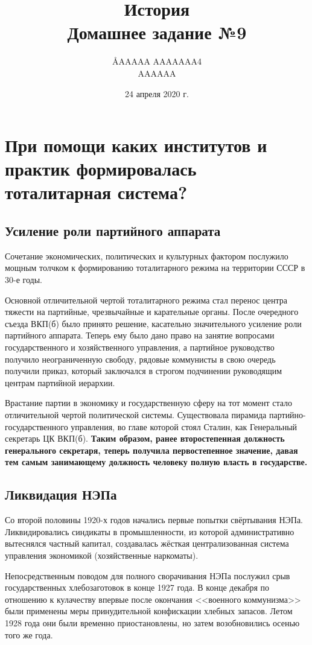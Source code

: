 \documentclass[12pt]{article}
\title{История \\ Домашнее задание №9}
\author{\AA{AAAAA AAAAAAA}{4} \\ AAAAAA}
\date{24 апреля 2020 г.}
\begin{document}
  \maketitle

  \setcounter{section}{2}
  \section{При помощи каких институтов и практик формировалась тоталитарная система?}
  \subsection{Усиление роли партийного аппарата}
  Сочетание экономических, политических и культурных фактором послужило мощным толчком к формированию тоталитарного режима на территории СССР в 30-е годы.

  Основной отличительной чертой тоталитарного режима стал перенос центра тяжести на партийные, чрезвычайные и карательные органы.
  После очередного съезда ВКП(б) было принято решение, касательно значительного усиление роли партийного аппарата.
  Теперь ему было дано право на занятие вопросами государственного и хозяйственного управления, а партийное руководство получило неограниченную свободу, рядовые коммунисты в свою очередь получили приказ, который заключался в строгом подчинении руководящим центрам партийной иерархии.

  Врастание партии в экономику и государственную сферу на тот момент стало отличительной чертой политической системы.
  Существовала пирамида партийно-государственного управления, во главе которой стоял Сталин, как Генеральный секретарь ЦК ВКП(б).
  \textbf{Таким образом, ранее второстепенная должность генерального секретаря, теперь получила первостепенное значение,
  давая тем самым занимающему должность человеку полную власть в государстве.}

  \subsection{Ликвидация НЭПа}
  Со второй половины 1920-х годов начались первые попытки свёртывания НЭПа.
  Ликвидировались синдикаты в промышленности, из которой административно вытеснялся частный капитал,
  создавалась жёсткая централизованная система управления экономикой (хозяйственные наркоматы).

  Непосредственным поводом для полного сворачивания НЭПа послужил срыв государственных хлебозаготовок в конце 1927 года.
  В конце декабря по отношению к кулачеству впервые после окончания <<военного коммунизма>> были применены меры принудительной конфискации хлебных запасов.
  Летом 1928 года они были временно приостановлены, но затем возобновились осенью того же года.
\end{document}
